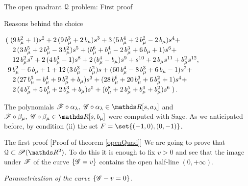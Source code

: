 \documentclass[11pt, a4paper, english, twoside, notitlepage, openright]{report}
\begin{document}
\begin{chapter}{The open quadrant $\mathcal{Q}$ problem: First proof}
\begin{section}{Reasons behind the choice}
\begin{enumerate}[(i)]
				$\arraycolsep=2pt\def\arraystretch{1.2}
\begin{array}{l}
\left(\right.{(9 \,b_{\mu}^{2}+1)}s^{2}+2 \,{(9 \,b_{\mu}^{3}+2\,b_{\mu})}s^{3}+3\,{(5\,b_{\mu}^{4}+2\,b_{\mu}^{2}-2\,b_{\mu})}s^{4}+\\
\quad 2\,{(3 \,b_{\mu}^{5}+2\,b_{\mu}^{3}-3\,b_{\mu}^{2})}s^{5}+{(b_{\mu}^{6}+b_{\mu}^{4}-2\,b_{\mu}^{3}+6\,b_{\mu}+1)} s^{6}+\\
\quad 12\,b_{\mu}^{2} s^{7}+2\,{(4\,b_{\mu}^{3}-1)}s^{8}+2\,{(b_{\mu}^{4}-b_{\mu})}s^{9}+s^{10}+2\,b_{\mu}s^{11}+b_{\mu}^{2} s^{12},\\
					\ 9 \, b_{\mu}^{2}-6 \, b_{\mu}+1+12 \, {(3 \, b_{\mu}^{3} - b_{\mu}^{2})} s+{(60\, b_{\mu}^{4} - 8 \, b_{\mu}^{3}+6 \, b_{\mu}-1)}s^{2} + \\
					\quad 2 \, {(27\,b_{\mu}^{5}-b_{\mu}^{4}+9\,b_{\mu}^{2}+b_{\mu})}s^{3}+{(28\,b_{\mu}^{6}+20\,b_{\mu}^{3}+6\,b_{\mu}^{2}+1)} s^{4}+\\
					\quad2\,{(4\,b_{\mu}^{7}+5\,b_{\mu}^{4}+2\,b_{\mu}^{3}+b_{\mu})}s^{5}+{(b_{\mu}^{8}+2\,b_{\mu}^{5}+ b_{\mu}^{4} +b_{\mu}^{2})} s^{6}\left.\right).
					\end{array}
$
\end{enumerate}
The polynomials $\F\circ\alpha_{\lambda },\ \G\circ\alpha_{\lambda}\in\R[s,a_{\lambda}]$ and $\F\circ\beta_{\mu},\ \G\circ\beta_{\mu}\in\R[s,b_{\mu}]$ were computed with Sage. As we anticipated before, by condition (ii) the set $F=\set{(-1, 0),(0,-1)}$.
\end{section}
\begin{section}{The first proof} [Proof of theorem \ref{openQuad}] We are going to prove that $\Qu\subset\P(\R^2)$. To do this it is enough to fix $v>0$ and see that the image under $\mathscr{F}$ of the curve $\{\mathscr{G}=v\}$ contains the open half-line $(0,+\infty)$.
\begin{center}
 \emph{Parametrization of the curve $\{\mathscr{G}-v=0\}$.}
\end{center}\label{step1}


\end{section}
\end{chapter}
\end{document}
